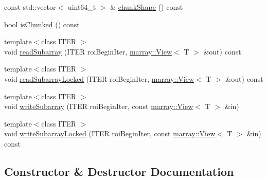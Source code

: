 \begin{DoxyCompactItemize}
\item 
const std\+::vector$<$ uint64\+\_\+t $>$ \& \hyperlink{classnifty_1_1hdf5_1_1Hdf5Array_a5e0e489414e1bef413cdf6f9b33aae66}{chunk\+Shape} () const 
\item 
bool \hyperlink{classnifty_1_1hdf5_1_1Hdf5Array_a4f528ec226501c76d88d66933e5bed81}{is\+Chunked} () const 
\item 
{\footnotesize template$<$class I\+T\+E\+R $>$ }\\void \hyperlink{classnifty_1_1hdf5_1_1Hdf5Array_a09f2804eb2d92a53c3123df6f4970414}{read\+Subarray} (I\+T\+E\+R roi\+Begin\+Iter, \hyperlink{classandres_1_1View}{marray\+::\+View}$<$ T $>$ \&out) const 
\item 
{\footnotesize template$<$class I\+T\+E\+R $>$ }\\void \hyperlink{classnifty_1_1hdf5_1_1Hdf5Array_a098888418cf243be746971ebdbb06754}{read\+Subarray\+Locked} (I\+T\+E\+R roi\+Begin\+Iter, \hyperlink{classandres_1_1View}{marray\+::\+View}$<$ T $>$ \&out) const 
\item 
{\footnotesize template$<$class I\+T\+E\+R $>$ }\\void \hyperlink{classnifty_1_1hdf5_1_1Hdf5Array_af6773c766d8f098f715e74de486df0af}{write\+Subarray} (I\+T\+E\+R roi\+Begin\+Iter, const \hyperlink{classandres_1_1View}{marray\+::\+View}$<$ T $>$ \&in)
\item 
{\footnotesize template$<$class I\+T\+E\+R $>$ }\\void \hyperlink{classnifty_1_1hdf5_1_1Hdf5Array_aaa52559f3b3baf61a0e3f4fed81dbb9c}{write\+Subarray\+Locked} (I\+T\+E\+R roi\+Begin\+Iter, const \hyperlink{classandres_1_1View}{marray\+::\+View}$<$ T $>$ \&in) const 
\end{DoxyCompactItemize}


\subsection{Constructor \& Destructor Documentation}
\hypertarget{classnifty_1_1hdf5_1_1Hdf5Array_af164b10a52ab55e3f5a72004b6f6e278}{}
